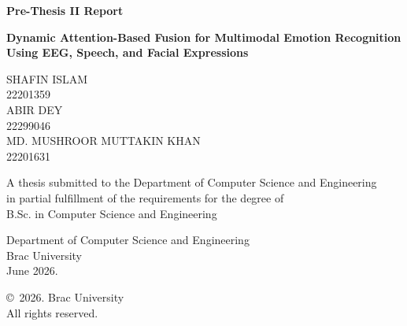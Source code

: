 \begin{titlepage}
\renewcommand*{\thepage}{Title} %

    \begin{center} 
        \vspace*{3cm} %
        
        {\fontsize{18pt}{24pt}\selectfont\textbf{Pre-Thesis II Report}}

        \vspace{1cm}

        {\fontsize{20pt}{26pt}\selectfont\textbf{Dynamic Attention-Based Fusion for Multimodal Emotion Recognition Using EEG, Speech, and Facial Expressions}}
        
        \vspace{1.5cm}
        
        
        \vspace{0.5cm}
        
        	SHAFIN ISLAM\\
	        22201359\\
	        ABIR DEY\\
	        22299046\\
	        MD. MUSHROOR MUTTAKIN KHAN\\
	        22201631\\


        \vspace{1.5cm}
        
        	A thesis submitted to the Department of Computer Science and Engineering\\
            in partial fulfillment of the requirements for the degree of\\
            B.Sc. in Computer Science and Engineering

        
        \vspace{2.5cm}
        
    		Department of Computer Science and Engineering\\
            Brac University\\
            June 2026.
        
        \vspace{3cm}
        
    		\copyright\ 2026. Brac University\\
            All rights reserved.
    
    \end{center}

\end{titlepage}